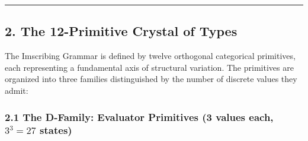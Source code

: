 \begin{center}\rule{0.5\linewidth}{0.5pt}\end{center}

\hypertarget{the-12-primitive-crystal-of-types}{%
\subsection{2. The 12-Primitive Crystal of
Types}\label{the-12-primitive-crystal-of-types}}

The Imscribing Grammar is defined by twelve orthogonal categorical
primitives, each representing a fundamental axis of structural
variation. The primitives are organized into three families
distinguished by the number of discrete values they admit:

\hypertarget{the-d-family-evaluator-primitives-3-values-each-33-27-states}{%
\subsubsection{\texorpdfstring{2.1 The D-Family: Evaluator Primitives (3
values each, \(3^3 = 27\)
states)}{2.1 The D-Family: Evaluator Primitives (3 values each, 3\^{}3 = 27 states)}}\label{the-d-family-evaluator-primitives-3-values-each-33-27-states}}

